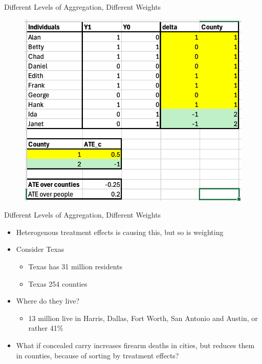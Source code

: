 \documentclass{beamer}
\begin{document}
\begin{frame}{Different Levels of Aggregation, Different Weights}

\begin{figure}
    \centering
    \includegraphics[height=0.8\textheight]{./lecture_includes/step1_weighted}
\end{figure}


\end{frame}

\begin{frame}{Different Levels of Aggregation, Different Weights}


\begin{itemize}
\item Heterogenous treatment effects is causing this, but so is weighting
\item Consider Texas
	\begin{itemize}
	\item Texas has 31 million residents
	\item Texas 254 counties
	\end{itemize}
\item Where do they live?
	\begin{itemize}
	\item 13 million live in Harris, Dallas, Fort Worth, San Antonio and Austin, or rather 41\% 
	\end{itemize}
\item What if concealed carry increases firearm deaths in cities, but reduces them in counties, because of sorting by treatment effects?
\end{itemize}

\end{frame}
\end{document}

